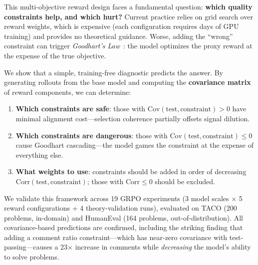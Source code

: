 \documentclass{article}
\newcommand{\Cov}{\mathrm{Cov}}
\newcommand{\Corr}{\mathrm{Corr}}
\begin{document}
This multi-objective reward design faces a fundamental question: \textbf{which quality constraints help, and which hurt?} Current practice relies on grid search over reward weights, which is expensive (each configuration requires days of GPU training) and provides no theoretical guidance. Worse, adding the ``wrong'' constraint can trigger \emph{Goodhart's Law}~\citep{goodhart1984problems}: the model optimizes the proxy reward at the expense of the true objective.

We show that a simple, training-free diagnostic predicts the answer. By generating rollouts from the base model and computing the \textbf{covariance matrix} of reward components, we can determine:

\begin{enumerate}
    \item \textbf{Which constraints are safe}: those with $\Cov(\text{test}, \text{constraint}) > 0$ have minimal alignment cost---selection coherence partially offsets signal dilution.
    \item \textbf{Which constraints are dangerous}: those with $\Cov(\text{test}, \text{constraint}) \leq 0$ cause Goodhart cascading---the model games the constraint at the expense of everything else.
    \item \textbf{What weights to use}: constraints should be added in order of decreasing $\Corr(\text{test}, \text{constraint})$; those with $\Corr \leq 0$ should be excluded.
\end{enumerate}

We validate this framework across 19 GRPO experiments (3 model scales $\times$ 5 reward configurations + 4 theory-validation runs), evaluated on TACO (200 problems, in-domain) and HumanEval (164 problems, out-of-distribution). All covariance-based predictions are confirmed, including the striking finding that adding a comment ratio constraint---which has near-zero covariance with test-passing---causes a 23$\times$ increase in comments while \emph{decreasing} the model's ability to solve problems.
\end{document}
